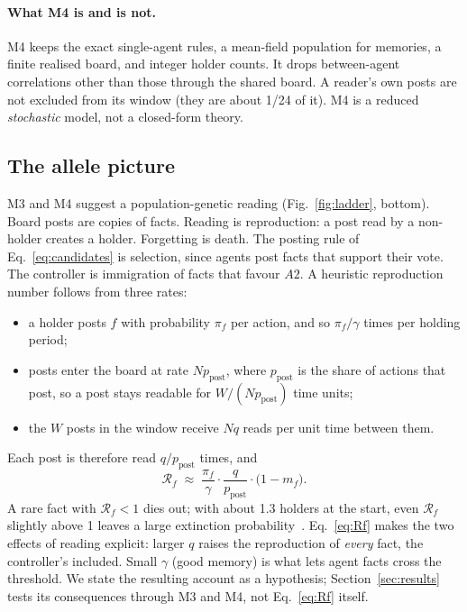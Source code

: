 \documentclass[10pt,a4paper]{article}
\begin{document}
\paragraph{What M4 is and is not.} M4 keeps the exact single-agent rules, a mean-field population for memories, a finite
realised board, and integer holder counts. It drops between-agent correlations other than those through the shared
board. A reader's own posts are not excluded from its window (they are about 1/24 of it). M4 is a reduced
\emph{stochastic} model, not a closed-form theory.

\subsection{The allele picture}
\label{sec:alleles}
M3 and M4 suggest a population-genetic reading (Fig.~\ref{fig:ladder}, bottom). Board posts are copies of facts.
Reading is reproduction: a post read by a non-holder creates a holder. Forgetting is death. The posting rule of
Eq.~\eqref{eq:candidates} is selection, since agents post facts that support their vote. The controller is immigration
of facts that favour $A2$. A heuristic reproduction number follows from three rates:
\begin{itemize}
\item a holder posts $f$ with probability $\pi_f$ per action, and so $\pi_f/\gamma$ times per holding period;
\item posts enter the board at rate $Np_{\text{post}}$, where $p_{\text{post}}$ is the share of actions that post, so a
  post stays readable for $W/(Np_{\text{post}})$ time units;
\item the $W$ posts in the window receive $Nq$ reads per unit time between them.
\end{itemize}
Each post is therefore read $q/p_{\text{post}}$ times, and
\begin{equation}
  \mathcal{R}_f\;\approx\;\frac{\pi_f}{\gamma}\cdot\frac{q}{p_{\text{post}}}\cdot\big(1-m_f\big).\label{eq:Rf}
\end{equation}
A rare fact with $\mathcal{R}_f<1$ dies out; with about 1.3 holders at the start, even $\mathcal{R}_f$ slightly above 1
leaves a large extinction probability~\cite{harris1963}. Eq.~\eqref{eq:Rf} makes the two effects of reading explicit:
larger $q$ raises the reproduction of \emph{every} fact, the controller's included. Small $\gamma$ (good memory) is what
lets agent facts cross the threshold. We state the resulting account as a hypothesis; Section~\ref{sec:results} tests
its consequences through M3 and M4, not Eq.~\eqref{eq:Rf} itself.
\end{document}
